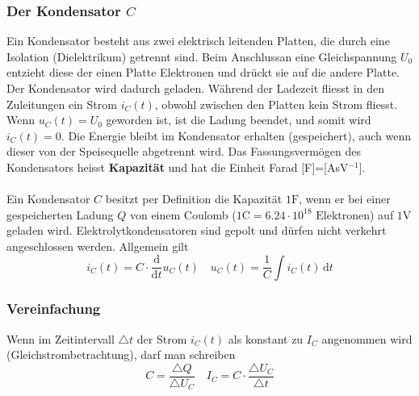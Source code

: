 \subsubsection{Der Kondensator $C$}
Ein Kondensator besteht aus zwei elektrisch leitenden Platten, die durch eine Isolation (Dielektrikum) getrennt sind. Beim Anschlussan eine Gleichspannung $U_0$ entzieht diese der einen Platte Elektronen und drückt sie auf die andere Platte. Der Kondensator wird dadurch geladen. Während der Ladezeit fliesst in den Zuleitungen ein Strom $i_C\left(t\right)$, obwohl zwischen den Platten kein Strom fliesst. Wenn $u_C\left(t\right)=U_0$ geworden ist, ist die Ladung beendet, und somit wird $i_C\left(t\right)=0$. Die Energie bleibt im Kondensator erhalten (gespeichert), auch wenn dieser von der Speisequelle abgetrennt wird. Das Fassungsvermögen des Kondensators heisst \textbf{Kapazität} und hat die Einheit Farad [F]=[AsV$^{-1}$].  
\\\\
Ein Kondensator $C$ besitzt per Definition die Kapazität $1\text{F}$, wenn er bei einer gespeicherten Ladung $Q$ von einem Coulomb ($1\text{C}=6.24\cdot 10^{18}\text{ Elektronen}$) auf $1\text{V}$ geladen wird. Elektrolytkondensatoren sind gepolt und dürfen nicht verkehrt angeschlossen werden. Allgemein gilt
\begin{equation}
\boxed{i_C\left(t\right)=C\cdot \dfrac{\text{d}}{\text{d}t}u_C\left(t\right)}\quad \boxed{u_C\left(t\right)=\dfrac{1}{C}\displaystyle \int i_C\left(t\right)\,\text{d}t}
\end{equation}
\subsubsection{Vereinfachung}
Wenn im Zeitintervall $\triangle t$ der Strom $i_C\left(t\right)$ als konstant zu $I_C$ angenommen wird (Gleichstrombetrachtung), darf man schreiben
\begin{equation}
\boxed{C=\dfrac{\triangle Q}{\triangle U_C}}\quad \boxed{I_C=C\cdot \dfrac{\triangle U_C}{\triangle t}}
\end{equation}
